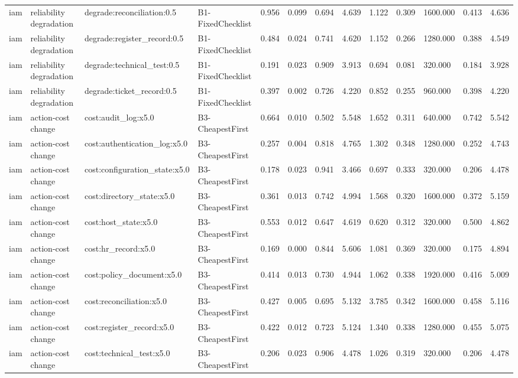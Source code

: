 \begin{table}[!ht]
{\begin{tabular}{lllllllllllll}
iam & reliability degradation & degrade:reconciliation:0.5 & B1-FixedChecklist & 0.956 & 0.099 & 0.694 & 4.639 & 1.122 & 0.309 & 1600.000 & 0.413 & 4.636 \\
iam & reliability degradation & degrade:register\_record:0.5 & B1-FixedChecklist & 0.484 & 0.024 & 0.741 & 4.620 & 1.152 & 0.266 & 1280.000 & 0.388 & 4.549 \\
iam & reliability degradation & degrade:technical\_test:0.5 & B1-FixedChecklist & 0.191 & 0.023 & 0.909 & 3.913 & 0.694 & 0.081 & 320.000 & 0.184 & 3.928 \\
iam & reliability degradation & degrade:ticket\_record:0.5 & B1-FixedChecklist & 0.397 & 0.002 & 0.726 & 4.220 & 0.852 & 0.255 & 960.000 & 0.398 & 4.220 \\
iam & action-cost change & cost:audit\_log:x5.0 & B3-CheapestFirst & 0.664 & 0.010 & 0.502 & 5.548 & 1.652 & 0.311 & 640.000 & 0.742 & 5.542 \\
iam & action-cost change & cost:authentication\_log:x5.0 & B3-CheapestFirst & 0.257 & 0.004 & 0.818 & 4.765 & 1.302 & 0.348 & 1280.000 & 0.252 & 4.743 \\
iam & action-cost change & cost:configuration\_state:x5.0 & B3-CheapestFirst & 0.178 & 0.023 & 0.941 & 3.466 & 0.697 & 0.333 & 320.000 & 0.206 & 4.478 \\
iam & action-cost change & cost:directory\_state:x5.0 & B3-CheapestFirst & 0.361 & 0.013 & 0.742 & 4.994 & 1.568 & 0.320 & 1600.000 & 0.372 & 5.159 \\
iam & action-cost change & cost:host\_state:x5.0 & B3-CheapestFirst & 0.553 & 0.012 & 0.647 & 4.619 & 0.620 & 0.312 & 320.000 & 0.500 & 4.862 \\
iam & action-cost change & cost:hr\_record:x5.0 & B3-CheapestFirst & 0.169 & 0.000 & 0.844 & 5.606 & 1.081 & 0.369 & 320.000 & 0.175 & 4.894 \\
iam & action-cost change & cost:policy\_document:x5.0 & B3-CheapestFirst & 0.414 & 0.013 & 0.730 & 4.944 & 1.062 & 0.338 & 1920.000 & 0.416 & 5.009 \\
iam & action-cost change & cost:reconciliation:x5.0 & B3-CheapestFirst & 0.427 & 0.005 & 0.695 & 5.132 & 3.785 & 0.342 & 1600.000 & 0.458 & 5.116 \\
iam & action-cost change & cost:register\_record:x5.0 & B3-CheapestFirst & 0.422 & 0.012 & 0.723 & 5.124 & 1.340 & 0.338 & 1280.000 & 0.455 & 5.075 \\
iam & action-cost change & cost:technical\_test:x5.0 & B3-CheapestFirst & 0.206 & 0.023 & 0.906 & 4.478 & 1.026 & 0.319 & 320.000 & 0.206 & 4.478 \\

\end{tabular}}
\end{table}
